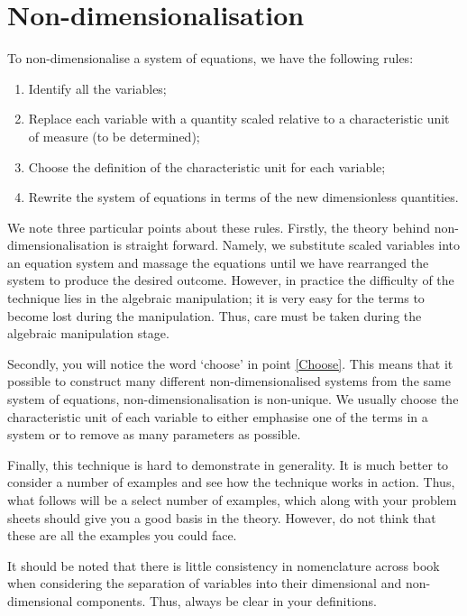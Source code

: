 \section{Non-dimensionalisation}\label{Non-dimensionalisation}
To non-dimensionalise a system of equations, we have the following rules:
\begin{enumerate}
\item Identify all the variables;
\item Replace each variable with a quantity scaled relative to a characteristic unit of measure (to be determined);
\item Choose the definition of the characteristic unit for each variable;\label{Choose}
\item Rewrite the system of equations in terms of the new dimensionless quantities.
\end{enumerate}
We note three particular points about these rules. Firstly, the theory behind non-dimensionalisation is straight forward. Namely, we substitute scaled variables into an equation system and massage the equations until we have rearranged the system to produce the desired outcome. However, in practice the difficulty of the technique lies in the algebraic manipulation; it is very easy for the terms to become lost during the manipulation. Thus, care must be taken during the algebraic manipulation stage.

Secondly, you will notice the word `choose' in point \ref{Choose}. This means that it possible to construct many different non-dimensionalised systems from the same system of equations, \ie non-dimensionalisation is non-unique. We usually choose the characteristic unit of each variable to either emphasise one of the terms in a system or to remove as many parameters as possible.

Finally, this technique is hard to demonstrate in generality. It is much better to consider a number of examples and see how the technique works in action. Thus, what follows will be a select number of examples, which along with your problem sheets should give you a good basis in the theory. However, do not think that these are all the examples you could face.

It should be noted that there is little consistency in nomenclature across book when considering the separation of variables into their dimensional and non-dimensional components. Thus, always be clear in your definitions.

